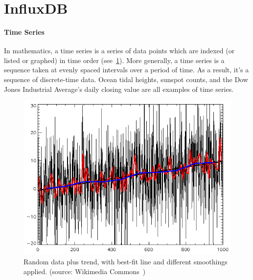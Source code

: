 \section{InfluxDB}
\paragraph{Time Series} In mathematics, a time series is a series of data points which are indexed (or listed or graphed) in time order (see~\ref{fig:random time-series}).
More generally, a time series is a sequence taken at evenly spaced intervals over a period of time. As a result, it's a sequence of discrete-time data.
Ocean tidal heights, sunspot counts, and the Dow Jones Industrial Average's daily closing value are all examples of time series.
\begin{figure}[ht]
    \centering
    \includegraphics[width=\textwidth]{content/chapter_3/images/random-data-plus-trend-r2.png}
    \caption{Random data plus trend, with best-fit line and different smoothings applied. (source: Wikimedia Commons~\cite{file:random-data-plus-trend-r2})}
    \label{fig:random time-series}
\end{figure}
